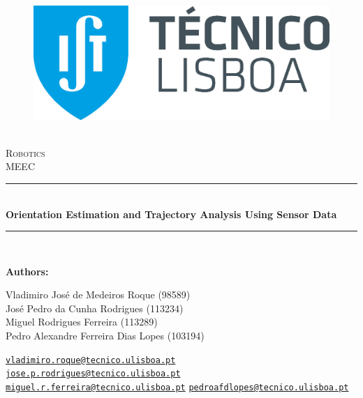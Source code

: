 \documentclass[12pt]{article}
\newcommand{\HRule}{\rule{\linewidth}{0.5mm}} %
\begin{document}
\begin{center}
    \begin{figure}
        \vspace{-1.0cm}
        \includegraphics[scale = 0.3, left]{Imagens/IST_A.eps} %
    \end{figure}
    \mbox{}\\[2.0cm]
    \textsc{\Huge Robotics}\\[2.5cm]
    \textsc{\LARGE MEEC}\\[2.0cm]
    \HRule\\[0.4cm]
    {\large \bf {\selectfont Orientation Estimation and Trajectory Analysis Using Sensor Data}}\\[0.2cm]
    \HRule\\[1.5cm]
\end{center}

\begin{flushleft}
    \textbf{\selectfont Authors:}
\end{flushleft}

\begin{center}
    \begin{minipage}{0.5\textwidth}
        \begin{flushleft}
            Vladimiro José de Medeiros Roque (98589)\\
            José Pedro da Cunha Rodrigues (113234)\\
            Miguel Rodrigues Ferreira (113289)\\
            Pedro Alexandre Ferreira Dias Lopes (103194)
        \end{flushleft}
    \end{minipage}%
    \begin{minipage}{0.5\textwidth}
        \begin{flushright}
            \href{mailto:vladimiro.roque@tecnico.ulisboa.pt}{\texttt{vladimiro.roque@tecnico.ulisboa.pt}}\\
            \href{mailto:jose.p.rodrigues@tecnico.ulisboa.pt}{\texttt{jose.p.rodrigues@tecnico.ulisboa.pt}}\\
            \href{mailto:miguel.r.ferreira@tecnico.ulisboa.pt}{\texttt{miguel.r.ferreira@tecnico.ulisboa.pt}}
            \href{mailto:pedroafdlopes@tecnico.ulisboa.pt}{\texttt{pedroafdlopes@tecnico.ulisboa.pt}}
        \end{flushright}
    \end{minipage}
\end{center}
    
\end{document}
